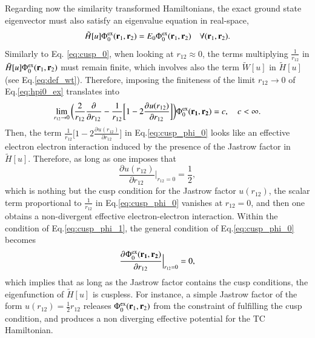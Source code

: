 \documentclass[aip,jcp,reprint,noshowkeys,superscriptaddress]{revtex4-1}
\newcommand{\deriv}[3]{\frac{\partial^{#3} #1}{\partial {#2}^{#3}}}
\newcommand{\bd}[1]{{\bf {#1}}}
\newcommand{\br}[0]{{\bf {r}}}
\newcommand{\phiex}[0]{\Phi^{\text{ex}}_0}
\begin{document}
Regarding now the similarity transformed Hamiltonians, the exact ground state eigenvector must also satisfy an eigenvalue equation in real-space,
\begin{equation}
 \label{eq:hpi0_ex}
 \tilde{H}[u] \phiex(\br{}_1,\br{}_2) = E_0 \phiex(\br{}_1,\br{}_2) \quad \forall (\br{}_1,\br{}_2).
\end{equation}
Similarly to Eq. \eqref{eq:cusp_0}, when looking at $r_{12}\approx 0$, the terms multiplying $\frac{1}{r_{12}}$ in $\tilde{H}[u]\phiex(\br{}_1,\br{}_2)$ must remain finite, 
which involves also the term $\tilde{W}[u]$ in $\tilde{H}[u]$ (see Eq.\eqref{eq:def_wt}). Therefore, imposing the finiteness of the limit $r_{12}\rightarrow 0$ of Eq.\eqref{eq:hpi0_ex} translates into
\begin{equation}
 \label{eq:cusp_phi_0}
 \lim_{r_{12}\rightarrow 0}\bigg( \frac{2}{r_{12}} \deriv{}{r_{12}}{} -\frac{1}{r_{12}}\bigg[ 1 - 2 \deriv{u(r_{12})}{r_{12}}{}\bigg]\bigg) \phiex(\bd{r_1},\bd{r_2})  = c,\quad c<\infty.
\end{equation}
Then, the term $\frac{1}{r_{12}}\bigg[ 1 - 2\deriv{u(r_{12})}{r_{12}}{}\bigg]$ in Eq.\eqref{eq:cusp_phi_0} looks like an effective electron electron interaction induced by the presence of the Jastrow factor in $\tilde{H}[u]$. 
Therefore, as long as one imposes that 
\begin{equation}
 \label{eq:cusp_phi_1}
  \deriv{u(r_{12})}{r_{12}}{}\bigg|_{r_{12}=0} = \frac{1}{2},
\end{equation}
which is nothing but the cusp condition for the Jastrow factor $u(r_{12})$, the scalar term proportional to $\frac{1}{r_{12}}$ in Eq.\eqref{eq:cusp_phi_0} vanishes at $r_{12}=0$, and then one obtains a non-divergent effective electron-electron interaction. 
Within the condition of Eq.\eqref{eq:cusp_phi_1}, the general condition of Eq.\eqref{eq:cusp_phi_0} becomes 
\begin{equation}
 \label{eq:cusp_phi_2}
 \deriv{\phiex(\bd{r_1},\bd{r_2})}{r_{12}}{}\Bigr|_{r_{12}=0} = 0, 
\end{equation}
which implies that as long as the Jastrow factor contains the cusp conditions, the eigenfunction of $\tilde{H}[u]$ is cuspless. 
For instance, a simple Jastrow factor of the form $u(r_{12}) = \frac{1}{2} r_{12}$ releases $\phiex(\br{}_1,\br{}_2)$ from 
the constraint of fulfilling the cusp condition, and produces a non diverging effective potential for the TC Hamiltonian. 
\end{document}

